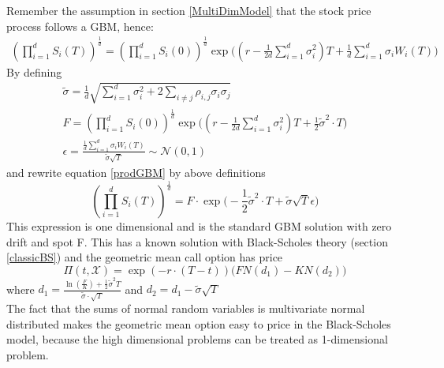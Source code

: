 Remember the assumption in section \ref{MultiDimModel} that the stock price process follows a GBM, hence:
\begin{equation}\label{prodGBM}
\begin{split}
(\prod_{i=1}^{d} S_i(T))^{\frac{1}{d}} = (\prod_{i=1}^{d} S_i(0))^{\frac{1}{d}} \exp\bigg((r-\frac{1}{2d}\sum_{i=1}^{d}\sigma_i^2)T + \frac{1}{d} \sum_{i=1}^{d} \sigma_i W_i(T) \bigg)
\end{split}
\end{equation}
By defining
\begin{align*}
\tilde{\sigma} = \frac{1}{d} \sqrt{\sum_{i=1}^{d} \sigma_i^2 + 2 \sum_{i\neq j} \rho_{i,j} \sigma_i \sigma_j}\\
F=(\prod_{i=1}^{d} S_i(0))^{\frac{1}{d}} \exp\bigg((r-\frac{1}{2d}\sum_{i=1}^{d}\sigma_i^2)T + \frac{1}{2} \tilde{\sigma}^2 \cdot T \bigg)\\
\epsilon = \frac{\frac{1}{d} \sum_{i=1}^{d} \sigma_i W_i(T)}{\tilde{\sigma} \sqrt{T}} \sim \mathcal{N}(0,1)
\end{align*}
and rewrite equation \eqref{prodGBM} by above definitions
$$(\prod_{i=1}^{d} S_i(T))^{\frac{1}{d}} = F \cdot \exp\bigg( -\frac{1}{2} \tilde{\sigma}^2 \cdot T + \tilde{\sigma} \sqrt{T} \epsilon \bigg)$$
This expression is one dimensional and is the standard GBM solution with zero drift and spot F. This has a known solution with Black-Scholes theory (section \ref{classicBS}) and the geometric mean call option has price
\begin{equation*}
\Pi(t,\mathcal{X})=\exp(-r \cdot (T-t))\bigg(F N(d_1) - K N(d_2) \bigg)
\end{equation*}
where $d_1=\frac{\ln(\frac{F}{K}) + \frac{1}{2} \tilde{\sigma}^2 T}{\tilde{\sigma} \cdot \sqrt{T}}$ and $d_2=d_1-\tilde{\sigma} \sqrt{T}$\\

The fact that the sums of normal random variables is multivariate normal distributed makes the geometric mean option easy to price in the Black-Scholes model, because the high dimensional problems can be treated as 1-dimensional problem.

